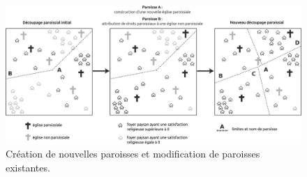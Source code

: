 \begin{figure}[!h]
	\centering
	\includegraphics[width=1\linewidth]{src/Chapitre_TMD/Fig5}
	\caption{Création de nouvelles paroisses et modification de paroisses existantes.}
	\label{fig:fig5}
\end{figure}

